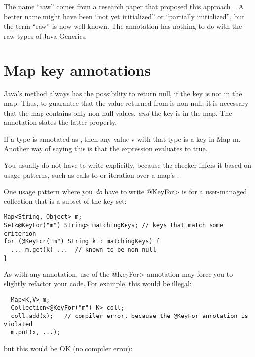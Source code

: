 The name ``raw'' comes from a research paper that proposed this
approach~\cite{FahndrichL2003}.
A better name might have been ``not yet initialized'' or ``partially
initialized'', but the term ``raw'' is now well-known.
The 
annotation has nothing to do with the raw types of Java Generics.


\section{Map key annotations\label{map-keys}}

Java's
method always has the possibility to return null, if the key is not in the
map.  Thus, to guarantee that the value returned from  is
non-null, it is necessary that the map contains only non-null values,
\emph{and} the key is in the map.
The  annotation states the latter
property.

If a type is annotated as , then any value v with that type
is a key in Map m.  Another way of saying this is that the expression
 evaluates to true.

You usually do not have to write  explicitly, because the
checker infers it based on usage patterns, such as calls to
 or iteration over a map's
.

One usage pattern where you \emph{do} have to write \<@KeyFor> is for a
user-managed collection that is a subset of the key set:

\begin{Verbatim}
Map<String, Object> m;
Set<@KeyFor("m") String> matchingKeys; // keys that match some criterion
for (@KeyFor("m") String k : matchingKeys) {
  ... m.get(k) ...  // known to be non-null
}
\end{Verbatim}

As with any annotation, use of the \<@KeyFor> annotation may force you to
slightly refactor your code.  For example, this would be illegal:

\begin{Verbatim}
  Map<K,V> m;
  Collection<@KeyFor("m") K> coll;
  coll.add(x);   // compiler error, because the @KeyFor annotation is violated
  m.put(x, ...);
\end{Verbatim}

\noindent
but this would be OK (no compiler error):

